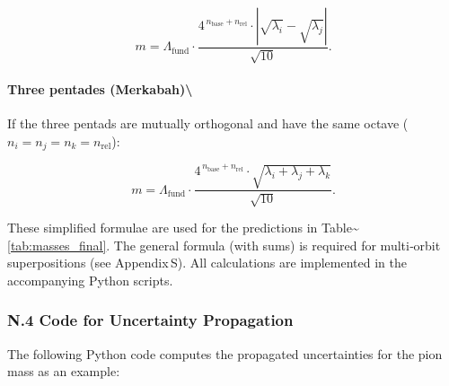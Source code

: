 \documentclass[11pt]{article}
\begin{document}
\[
m = \Lambda_{\text{fund}} \cdot \frac{4^{\,n_{\text{base}} + n_{\text{rel}}} \cdot |\sqrt{\lambda_i} - \sqrt{\lambda_j}|}{\sqrt{10}}.
\]

\hypertarget{three-pentades-merkabah}{%
\paragraph{Three pentades
(Merkabah)\textbackslash{}}\label{three-pentades-merkabah}}

If the three pentads are mutually orthogonal and have the same octave
(\(n_i = n_j = n_k = n_{\text{rel}}\)):

\[
m = \Lambda_{\text{fund}} \cdot \frac{4^{\,n_{\text{base}} + n_{\text{rel}}} \cdot \sqrt{\lambda_i + \lambda_j + \lambda_k}}{\sqrt{10}}.
\]

These simplified formulae are used for the predictions in
Table\textasciitilde{}\ref{tab:masses_final}. The general formula (with
sums) is required for multi‑orbit superpositions (see Appendix\,S). All
calculations are implemented in the accompanying Python scripts.

\hypertarget{n.4-code-for-uncertainty-propagation}{%
\subsubsection{N.4 Code for Uncertainty
Propagation}\label{n.4-code-for-uncertainty-propagation}}

The following Python code computes the propagated uncertainties for the
pion mass as an example:
\end{document}
